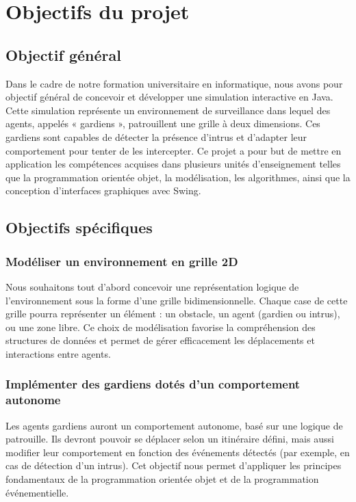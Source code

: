 
\section{Objectifs du projet}

\subsection{Objectif général}

Dans le cadre de notre formation universitaire en informatique, nous avons pour objectif général de concevoir et développer une simulation interactive en Java. Cette simulation représente un environnement de surveillance dans lequel des agents, appelés « gardiens », patrouillent une grille à deux dimensions. Ces gardiens sont capables de détecter la présence d’intrus et d’adapter leur comportement pour tenter de les intercepter. Ce projet a pour but de mettre en application les compétences acquises dans plusieurs unités d’enseignement telles que la programmation orientée objet, la modélisation, les algorithmes,  ainsi que la conception d’interfaces graphiques avec Swing.
\subsection{Objectifs spécifiques}


\subsubsection{ Modéliser un environnement en grille 2D}

Nous souhaitons tout d’abord concevoir une représentation logique de l’environnement sous la forme d’une grille bidimensionnelle. Chaque case de cette grille pourra représenter un élément : un obstacle, un agent (gardien ou intrus), ou une zone libre. Ce choix de modélisation favorise la compréhension des structures de données et permet de gérer efficacement les déplacements et interactions entre agents.

\subsubsection{Implémenter des gardiens dotés d’un comportement autonome}

Les agents gardiens auront un comportement autonome, basé sur une logique de patrouille. Ils devront pouvoir se déplacer selon un itinéraire défini, mais aussi modifier leur comportement en fonction des événements détectés (par exemple, en cas de détection d’un intrus). Cet objectif nous permet d’appliquer les principes fondamentaux de la programmation orientée objet et de la programmation événementielle.

